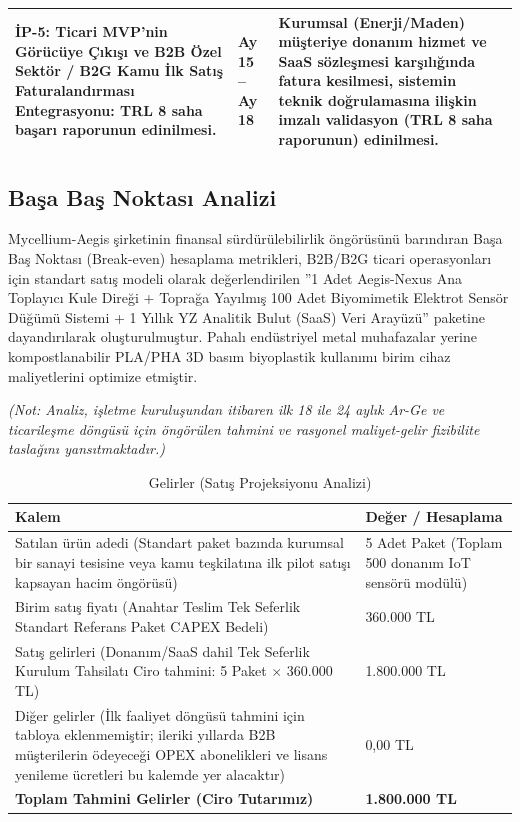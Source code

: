 \documentclass[11pt,a4paper]{article}
\begin{document}
\begin{longtable}{p{4.3cm}p{2.1cm}p{7.8cm}}
\addlinespace
\textbf{İP-5: Ticari MVP'nin Görücüye Çıkışı ve B2B Özel Sektör / B2G Kamu İlk Satış Faturalandırması Entegrasyonu:} TRL 8 saha başarı raporunun edinilmesi. & Ay 15 -- Ay 18 & Kurumsal (Enerji/Maden) müşteriye donanım hizmet ve SaaS sözleşmesi karşılığında fatura kesilmesi, sistemin teknik doğrulamasına ilişkin imzalı validasyon (TRL 8 saha raporunun) edinilmesi.\\
\bottomrule
\end{longtable}

\subsection{Başa Baş Noktası Analizi}

Mycellium-Aegis şirketinin finansal sürdürülebilirlik öngörüsünü barındıran Başa Baş Noktası (Break-even) hesaplama metrikleri, B2B/B2G ticari operasyonları için standart satış modeli olarak değerlendirilen ''1 Adet Aegis-Nexus Ana Toplayıcı Kule Direği + Toprağa Yayılmış 100 Adet Biyomimetik Elektrot Sensör Düğümü Sistemi + 1 Yıllık YZ Analitik Bulut (SaaS) Veri Arayüzü'' paketine dayandırılarak oluşturulmuştur. Pahalı endüstriyel metal muhafazalar yerine kompostlanabilir PLA/PHA 3D basım biyoplastik kullanımı birim cihaz maliyetlerini optimize etmiştir.

\textit{(Not: Analiz, işletme kuruluşundan itibaren ilk 18 ile 24 aylık Ar-Ge ve ticarileşme döngüsü için öngörülen tahmini ve rasyonel maliyet-gelir fizibilite taslağını yansıtmaktadır.)}

\begin{table}[h]
\centering
\caption{Gelirler (Satış Projeksiyonu Analizi)}
\begin{tabular}{p{9.5cm}p{4.5cm}}
\toprule
\textbf{Kalem} & \textbf{Değer / Hesaplama}\\
\midrule
Satılan ürün adedi (Standart paket bazında kurumsal bir sanayi tesisine veya kamu teşkilatına ilk pilot satışı kapsayan hacim öngörüsü) & 5 Adet Paket (Toplam 500 donanım IoT sensörü modülü)\\
Birim satış fiyatı (Anahtar Teslim Tek Seferlik Standart Referans Paket CAPEX Bedeli) & 360.000 TL\\
Satış gelirleri (Donanım/SaaS dahil Tek Seferlik Kurulum Tahsilatı Ciro tahmini: 5 Paket $\times$ 360.000 TL) & 1.800.000 TL\\
Diğer gelirler (İlk faaliyet döngüsü tahmini için tabloya eklenmemiştir; ileriki yıllarda B2B müşterilerin ödeyeceği OPEX abonelikleri ve lisans yenileme ücretleri bu kalemde yer alacaktır) & 0,00 TL\\
\midrule
\textbf{Toplam Tahmini Gelirler (Ciro Tutarımız)} & \textbf{1.800.000 TL}\\
\bottomrule
\end{tabular}
\end{table}
\end{document}
